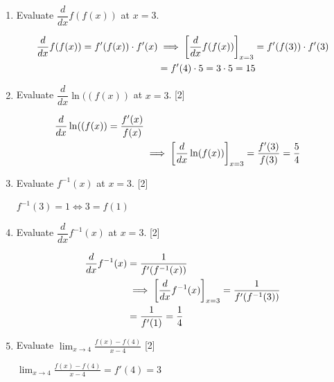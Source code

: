 \documentclass{ximera}
\begin{document}
\begin{problem}
\begin{enumerate}
    \item Evaluate $\dfrac{d}{dx} f(f(x))$ at $x = 3$.
\begin{explanation}
        \begin{align*}
          \dfrac{d}{dx} f(f(x)) = f'(f(x)) \cdot f'(x) &\implies \bigg[ \dfrac{d}{dx} f(f(x)) \bigg]_{x = 3} = f'(f(3)) \cdot f'(3)\\
          &= f'(4) \cdot 5 = 3 \cdot 5 = 15
        \end{align*}
      \end{explanation}
    \item Evaluate $\dfrac{d}{dx}\ln((f(x))$ at $x = 3$.
[2]
      \begin{explanation}
        \begin{align*}
          \dfrac{d}{dx}\ln((f(x)) = \frac{f'(x)}{f(x)} \\
          &\implies \bigg[ \dfrac{d}{dx} \ln(f(x)) \bigg]_{x = 3} = \frac{f'(3)}{f(3)} = \frac{5}{4}
        \end{align*}
      \end{explanation}
    \item Evaluate $f^{-1}(x)$ at $x = 3$.
[2]
      \begin{explanation}
	$ f^{-1}(3) = 1 \iff 3 = f(1)$
      \end{explanation}
    \item Evaluate $\dfrac{d}{dx} f^{-1}(x)$ at $x = 3$.
[2]
      \begin{explanation}
        \begin{align*}
          \dfrac{d}{dx} f^{-1}(x) &= \frac{1}{f'(f^{-1}(x))} \\
          &\implies \bigg[ \dfrac{d}{dx} f^{-1}(x) \bigg]_{x = 3} = \frac{1}{f'(f^{-1}(3))} \\
          &= \frac{1}{f'(1)} = \frac{1}{4}
        \end{align*}
      \end{explanation}
      \item Evaluate $\lim_{x \to 4} \frac{f(x)-f(4)}{x-4}$
[2]
      \begin{explanation}
$\lim_{x \to 4} \frac{f(x)-f(4)}{x-4} = f'(4)=3$
      \end{explanation}
  \end{enumerate}
\end{problem}
\end{document}
